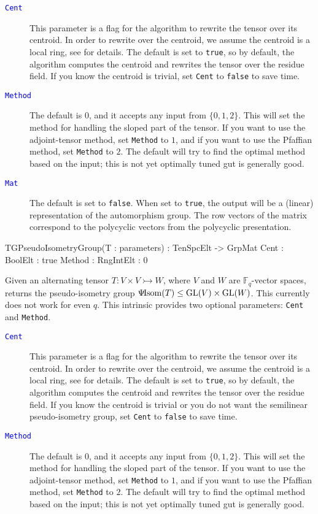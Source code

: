 \documentclass{documentation}
\DeclareMathOperator{\isom}{Isom}
\DeclareMathOperator{\GL}{{\rm GL}}
\newcommand{\pseudo}{\Psi\hspace*{-1mm}\isom}
\begin{document}
\begin{description}
\item[\textcolor{blue}{\tt Cent}]
This parameter is a flag for the algorithm to rewrite the tensor over its centroid. 
In order to rewrite over the centroid, we assume the centroid is a local ring, see \cite{TensorSpacePackage} for details.
The default is set to {\tt true}, so by default, the algorithm computes the centroid and rewrites the tensor over the residue field.
If you know the centroid is trivial, set {\tt Cent} to {\tt false} to save time.
\item[\textcolor{blue}{\tt Method}]
The default is $0$, and it accepts any input from $\{ 0,1,2\}$. 
This will set the method for handling the sloped part of the tensor.
If you want to use the adjoint-tensor method, set {\tt Method} to $1$, and if you want to use the Pfaffian method, set {\tt Method} to $2$. The default will try to find the optimal method based on the input; this is not yet optimally tuned gut is generally good.
\item[\textcolor{blue}{\tt Mat}]
The default is set to \texttt{false}. When set to \texttt{true}, the output will be a (linear) representation of the automorphism group. The row vectors of the matrix correspond to the polycyclic vectors from the polycyclic presentation.
\end{description}

\begin{intrinsics}
TGPseudoIsometryGroup(T : parameters) : TenSpcElt -> GrpMat
    Cent : BoolElt : true
    Method : RngIntElt : 0
\end{intrinsics}

Given an alternating tensor $T : V \times V \rightarrowtail W$, where $V$ and $W$ are $\mathbb{F}_q$-vector spaces, returns the pseudo-isometry group $\pseudo(T)\leq \GL(V)\times \GL(W)$.
This currently does not work for even $q$. 
This intrinsic provides two optional parameters: {\tt Cent} and {\tt Method}. 

\begin{description}
\item[\textcolor{blue}{\tt Cent}]
This parameter is a flag for the algorithm to rewrite the tensor over its centroid. 
In order to rewrite over the centroid, we assume the centroid is a local ring, see \cite{TensorSpacePackage} for details.
The default is set to {\tt true}, so by default, the algorithm computes the centroid and rewrites the tensor over the residue field.
If you know the centroid is trivial or you do not want the semilinear pseudo-isometry group, set {\tt Cent} to {\tt false} to save time.
\item[\textcolor{blue}{\tt Method}]
The default is $0$, and it accepts any input from $\{ 0,1,2\}$. 
This will set the method for handling the sloped part of the tensor.
If you want to use the adjoint-tensor method, set {\tt Method} to $1$, and if you want to use the Pfaffian method, set {\tt Method} to $2$. The default will try to find the optimal method based on the input; this is not yet optimally tuned gut is generally good.
\end{description}
\end{document}
